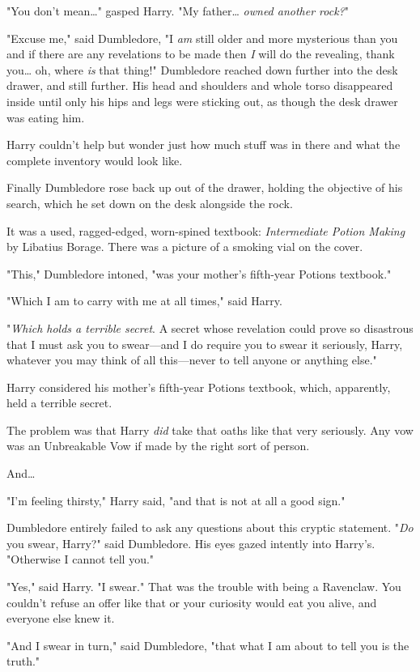 "You don't mean{\ldots}" gasped Harry. "My father{\ldots} \emph{owned another
rock?}"

"Excuse me," said Dumbledore, "I \emph{am} still older and more mysterious than
you and if there are any revelations to be made then \emph{I} will do the
revealing, thank you{\ldots} oh, where \emph{is} that thing!" Dumbledore
reached down further into the desk drawer, and still further. His head and
shoulders and whole torso disappeared inside until only his hips and legs were
sticking out, as though the desk drawer was eating him.

Harry couldn't help but wonder just how much stuff was in there and what the
complete inventory would look like.

Finally Dumbledore rose back up out of the drawer, holding the objective of his
search, which he set down on the desk alongside the rock.

It was a used, ragged-edged, worn-spined textbook: \emph{Intermediate Potion
Making} by Libatius Borage. There was a picture of a smoking vial on the cover.

"This," Dumbledore intoned, "was your mother's fifth-year Potions textbook."

"Which I am to carry with me at all times," said Harry.

"\emph{Which holds a terrible secret}. A secret whose revelation could prove so
disastrous that I must ask you to swear---and I do require you to swear it
seriously, Harry, whatever you may think of all this---never to tell anyone or
anything else."

Harry considered his mother's fifth-year Potions textbook, which, apparently,
held a terrible secret.

The problem was that Harry \emph{did} take that oaths like that very seriously.
Any vow was an Unbreakable Vow if made by the right sort of person.

And{\ldots}

"I'm feeling thirsty," Harry said, "and that is not at all a good sign."

Dumbledore entirely failed to ask any questions about this cryptic statement.
"\emph{Do} you swear, Harry?" said Dumbledore. His eyes gazed intently into
Harry's. "Otherwise I cannot tell you."

"Yes," said Harry. "I swear." That was the trouble with being a Ravenclaw. You
couldn't refuse an offer like that or your curiosity would eat you alive, and
everyone else knew it.

"And I swear in turn," said Dumbledore, "that what I am about to tell you is
the truth."

